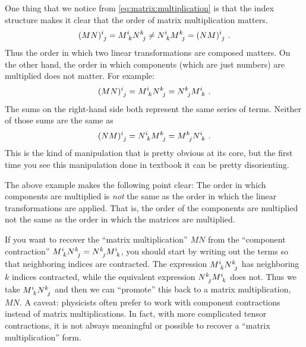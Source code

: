 \documentclass[12pt]{article}
\begin{document}
\begin{example}
One thing that we notice from \eqref{eq:matrix:multiplication} is that the index structure makes it clear that the order of matrix multiplication matters.
\begin{align}
    (MN)\aij{i}{j} = M\aij{i}{k}N\aij{k}{j} 
    \neq 
    N\aij{i}{k}M\aij{k}{j} 
    =
    (NM)\aij{i}{j} \ .
\end{align}
Thus the order in which two linear transformations are composed matters. On the other hand, the order in which components (which are just numbers) are multiplied does not matter. For example:
\begin{align}
    (MN)\aij{i}{j} 
    = M\aij{i}{k} N\aij{k}{j}  
    = N\aij{k}{j} M\aij{i}{k} \ .
\end{align}
The sums on the right-hand side both represent the same series of terms. Neither of those sums are the same as 
\begin{align}
    (NM)\aij{i}{j}
    =
    N\aij{i}{k}M\aij{k}{j}
    =
    M\aij{k}{j} N\aij{i}{k} \ .
\end{align}
This is the kind of manipulation that is pretty obvious at its core, but the first time you see this manipulation done in textbook it can be pretty disorienting. 
\end{example}
The above example makes the following point clear: The order in which components are multiplied is \emph{not} the same as the order in which the linear transformations are applied. That is, the order of the components are multiplied not the same as the order in which the matrices are multiplied.
\begin{example}
If you want to recover the ``matrix multiplication'' $MN$ from the ``component contraction'' $M\aij{i}{k} N\aij{k}{j}  
    = N\aij{k}{j} M\aij{i}{k}$, you should start by writing out the terms so that neighboring indices are contracted. The expression $M\aij{i}{k} N\aij{k}{j}$ has neighboring $k$ indices contracted, while the equivalent expression $N\aij{k}{j} M\aij{i}{k}$ does not. Thus we take $M\aij{i}{k} N\aij{k}{j}$ and then we can ``promote'' this back to a matrix multiplication, $MN$. A caveat: physicists often prefer to work with component contractions instead of matrix multiplications. In fact, with more complicated tensor contractions, it is not always meaningful or possible to recover a ``matrix multiplication'' form.
\end{example}
\end{document}
